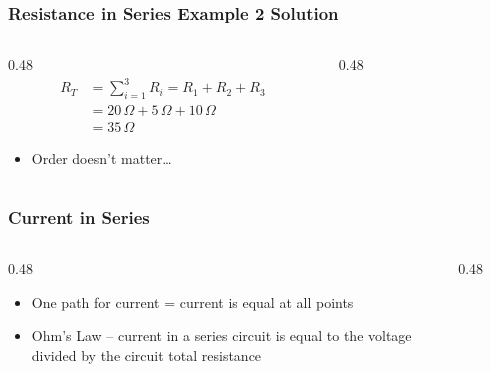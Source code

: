 \begin{frame}
    \frametitle{Resistance in Series Example 2 Solution}
	\begin{columns}
        \begin{column}{0.48\linewidth}
            \[
                \begin{aligned}                        
                    R_T&=\sum_{i=1}^{3}R_i=R_1+R_2+R_3\\
                    &=20\,\Omega + 5\,\Omega + 10\,\Omega\\
                    &=35\,\Omega
                \end{aligned}
            \]

            \begin{itemize}
                \item Order doesn't matter\dots
            \end{itemize}
        \end{column}
        \begin{column}{0.48\linewidth}
            \begin{figure}
                \centering
                \resizebox{\columnwidth}{!}{
                    
                }
            \end{figure}
        \end{column}
	\end{columns}
\end{frame}

\begin{frame}
    \frametitle{Current in Series}

    \begin{columns}
        \begin{column}{0.48\linewidth}
            \begin{itemize}[<+- | alert@+>]
                \item{One path for current = current is equal at all points}
                \item{Ohm's Law -- current in a series circuit is equal to the voltage divided by the circuit total resistance}
            \end{itemize}
        \end{column}
        \begin{column}{0.48\linewidth}
            \begin{figure}
                \centering
                \resizebox{\columnwidth}{!}{
                    
                }
            \end{figure}
        \end{column}
	\end{columns}
\end{frame}

